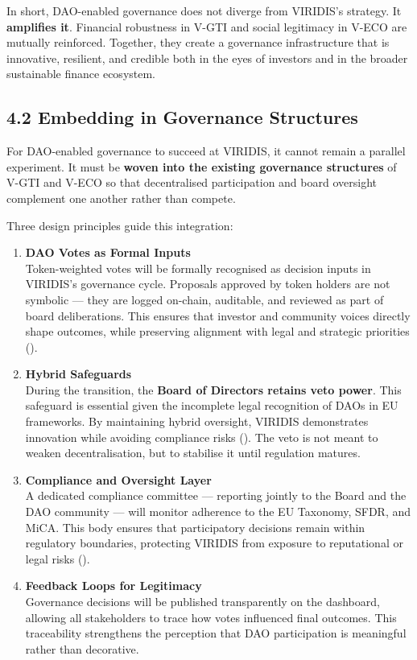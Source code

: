 \documentclass[
  english,
  12pt,
  oneside,
  open=any]{scrbook}
\begin{document}
In short, DAO-enabled governance does not diverge from VIRIDIS's
strategy. It \textbf{amplifies it}. Financial robustness in V-GTI and
social legitimacy in V-ECO are mutually reinforced. Together, they
create a governance infrastructure that is innovative, resilient, and
credible both in the eyes of investors and in the broader sustainable
finance ecosystem.

\subsection{4.2 Embedding in Governance Structures}\label{sec-embedding}

For DAO-enabled governance to succeed at VIRIDIS, it cannot remain a
parallel experiment. It must be \textbf{woven into the existing
governance structures} of V-GTI and V-ECO so that decentralised
participation and board oversight complement one another rather than
compete.

Three design principles guide this integration:

\begin{enumerate}
\def\labelenumi{\arabic{enumi}.}
\item
  \textbf{DAO Votes as Formal Inputs}\\
  Token-weighted votes will be formally recognised as decision inputs in
  VIRIDIS's governance cycle. Proposals approved by token holders are
  not symbolic --- they are logged on-chain, auditable, and reviewed as
  part of board deliberations. This ensures that investor and community
  voices directly shape outcomes, while preserving alignment with legal
  and strategic priorities
  ().
\item
  \textbf{Hybrid Safeguards}\\
  During the transition, the \textbf{Board of Directors retains veto
  power}. This safeguard is essential given the incomplete legal
  recognition of DAOs in EU frameworks. By maintaining hybrid oversight,
  VIRIDIS demonstrates innovation while avoiding compliance risks
  (). The veto is not meant to weaken decentralisation, but to
  stabilise it until regulation matures.
\item
  \textbf{Compliance and Oversight Layer}\\
  A dedicated compliance committee --- reporting jointly to the Board
  and the DAO community --- will monitor adherence to the EU Taxonomy,
  SFDR, and MiCA. This body ensures that participatory decisions remain
  within regulatory boundaries, protecting VIRIDIS from exposure to
  reputational or legal risks
  ().
\item
  \textbf{Feedback Loops for Legitimacy}\\
  Governance decisions will be published transparently on the dashboard,
  allowing all stakeholders to trace how votes influenced final
  outcomes. This traceability strengthens the perception that DAO
  participation is meaningful rather than decorative.
\end{enumerate}
\end{document}

